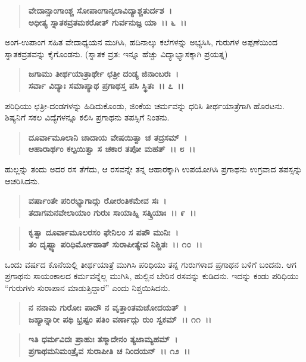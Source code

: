 \begin{verse}
\textbf{ವೇದಾನ್ಸಾಂಗಾಂಶ್ಚ ಸೋಪಾಂಗಾನ್ಕಲಾವಿದ್ಯಾಶ್ಚತುರ್ದಶ~।}\\\textbf{ಅಧೀತ್ಯ ಸ್ನಾತಕವ್ರತಮಕರೋತ್ ಗುರ್ವನುಜ್ಞ ಯಾ~।। ೬~।।}
\end{verse}

ಅಂಗ-ಉಪಾಂಗ ಸಹಿತ ವೇದಾಧ್ಯಯನ ಮುಗಿಸಿ, ಹದಿನಾಲ್ಕು ಕಲೆಗಳನ್ನು ಅಭ್ಯಸಿಸಿ, ಗುರುಗಳ ಅಪ್ಪಣೆಯಿಂದ ಸ್ನಾತಕವ್ರತವನ್ನು ಕೈಗೊಂಡನು. (ಸ್ನಾತಕ ವ್ರತ: ಇನ್ನೂ ಹೆಚ್ಚು ವಿದ್ಯಾಭ್ಯಾಸಕ್ಕಾಗಿ ಪ್ರಯತ್ನ)

\begin{verse}
\textbf{ಜಗಾಮು ತೀರ್ಥಯಾತ್ರಾರ್ಥೇ ಛತ್ರೀ ದಂಡ್ಯ ಜಿನಾಂಬರಃ~।}\\\textbf{ಸರ್ವಾ ವಿದ್ಯಾಃ ಸಮಾಪ್ಯಾಥ ಪ್ರಗಾಥಸ್ತ ಪಸಿ ಸ್ಥಿತಃ~।। ೭~।।}
\end{verse}

ಪರಿಧಿಯು ಛತ್ರೀ-ದಂಡಗಳನ್ನು ಹಿಡಿದುಕೊಂಡು, ಜಿಂಕೆಯ ಚರ್ಮವನ್ನು ಧರಿಸಿ ತೀರ್ಥಯಾತ್ರೆಗಾಗಿ ಹೊರಟನು. ಶಿಷ್ಯನಿಗೆ ಸಕಲ ವಿದ್ಯೆಗಳನ್ನೂ ಕಲಿಸಿ ಪ್ರಗಾಥನು ತಪಸ್ಸಿಗೆ ನಿಂತನು.

\begin{verse}
\textbf{ದೂರ್ವಾಮೂಲಾನಿ ಚಾದಾಯ ವೇಷಯಿತ್ವಾ ಚ ತದ್ರಸಮ್~।}\\\textbf{ಆಹಾರಾರ್ಥಂ ಕಲ್ಪಯಿತ್ವಾ ಸ ಚಕಾರ ತಪೋ ಮಹತ್~।। ೮~।।}
\end{verse}

ಹುಲ್ಲನ್ನು ತಂದು ಅದರ ರಸ ತೆಗೆದು, ಆ ರಸವನ್ನೇ ತನ್ನ ಆಹಾರಕ್ಕಾಗಿ ಉಪಯೋಗಿಸಿ ಪ್ರಗಾಥನು ಉಗ್ರವಾದ ತಪಸ್ಸನ್ನು ಆಚರಿಸಿದನು.

\begin{verse}
\textbf{ವರ್ಷಾಂತೇ ಪರಿರಭ್ಯಾಗಾದ್ಗು ರೋರಂತಿಕಮೇವ ಸಃ~।}\\\textbf{ತದಾಗಮನವೇಲಾಯಾಂ ಗುರುಃ ಸಾಯಾಹ್ನಿ ಸತ್ಕ್ರಿಯಾಃ~।। ೯~।। }
\end{verse}

\begin{verse}
\textbf{ಕೃತ್ವಾ ದೂರ್ವಾಮೂಲರಸಂ ಫೇನಿಲಂ ಸ ಪಪೌ ಮುನಿಃ~।}\\\textbf{ತಂ ದೃಷ್ಟ್ವಾ ಪರಿಧಿರ್ಮೋಹಾತ್ ಸುರಾಪೀತ್ಯೇವ ನಿಶ್ಚಿತಃ~।। ೧೦~।।}
\end{verse}

ಒಂದು ವರ್ಷದ ಕೊನೆಯಲ್ಲಿ ತೀರ್ಥಯಾತ್ರೆ ಮುಗಿಸಿ ಪರಿಧಿಯು ತನ್ನ ಗುರುಗಳಾದ ಪ್ರಗಾಥನ ಬಳಿಗೆ ಬಂದನು. ಆಗ ಪ್ರಗಾಥನು ಸಾಯಂಕಾಲದ ಕರ್ಮವನ್ನೆಲ್ಲ ಮುಗಿಸಿ, ಹುಲ್ಲಿನ ಬೇರಿನ ರಸವನ್ನು ಕುಡಿದನು. ಇದನ್ನು ಕಂಡು ಪರಿಧಿಯು “ಗುರುಗಳು ಸುರಾಪಾನ ಮಾಡುತ್ತಿದ್ದಾರೆ” ಎಂದು ನಿಶ್ಚಯಿಸಿದನು.

\begin{verse}
\textbf{ನ ನನಾಮ ಗುರೋಃ ಪಾದೌ ನ ವೃತ್ತಾಂತಮಚೋದಯತ್~।}\\\textbf{ಜಹ್ಯಾನ್ನಾರೀ ಪಥಿ ಭ್ರಷ್ಟಂ ಪತಿಂ ವರ್ಣಾದ್ಗು ರುಂ ಸ್ವಕಮ್~।। ೧೧~।। }
\end{verse}

\begin{verse}
\textbf{ಇತಿ ಧರ್ಮವಿದಃ ಪ್ರಾಹುಃ ತಸ್ಮಾದೇನಂ ತ್ಯಜಾಮ್ಯಹಮ್~।}\\\textbf{ಪ್ರಗಾಥಮನಿಮಂತ್ರೈವ ಸುರಾಪೀತಿ ಚ ನಿಂದಯನ್~।। ೧೨~।।}
\end{verse}

